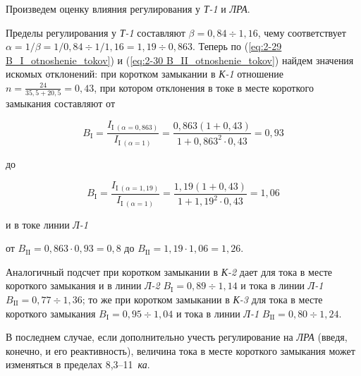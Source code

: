 \begin{small}
	Произведем оценку влияния регулирования у \textit{Т-1} и \textit{ЛРА}.
	
	Пределы регулирования у \textit{Т-1} составляют $ \beta = 0,84 \div 1,16 $, чему соответствует $ \alpha = 1/\beta = 1/0,84 \div 1/1,16 = 1,19 \div 0,863 $. Теперь по (\ref{eq:2-29 B_I_otnoshenie_tokov}) и (\ref{eq:2-30 B_II_otnoshenie_tokov}) найдем значения искомых отклонений: при коротком замыкании в \textit{К-1} отношение $ n = \frac{24}{35,5 + 20,5} = 0,43 $, при котором отклонения в токе в месте короткого замыкания составляют от
	
	\begin{equation*}
		B_{\text{I}} = \frac{I_{\text{I}~(\alpha=0,863)}}{I_{\text{I}~(\alpha=1)}} = \frac{0,863 (1+0,43)}{1 + 0,863^2 \cdot 0,43} = 0,93
	\end{equation*}
	
	до
	
	\begin{equation*}
		B_\text{I} = \frac{I_{\text{I}~(\alpha=1,19)}}{I_{\text{I}~(\alpha=1)}} = \frac{1,19 (1+0,43)}{1 + 1,19^2 \cdot 0,43} = 1,06
	\end{equation*}
	
	и в токе линии \textit{Л-1}
	
	от $ B_{\text{II}} = 0,863 \cdot 0,93 = 0,8 $ до $ B_{\text{II}} = 1,19 \cdot 1,06 = 1,26 $.
	
	Аналогичный подсчет при коротком замыкании в \textit{К-2} дает для тока в месте короткого замыкания и в линии \textit{Л-2} $ B_{\text{I}} = 0,89 \div 1,14 $ и тока в линии \textit{Л-1} $ B_{\text{II}} = 0,77 \div 1,36 $; то же при коротком замыкании в \textit{К-3} для тока в месте короткого замыкания $ B_{\text{I}} = 0,95 \div 1,04 $ и тока в линии \textit{Л-1} $ B_{\text{II}} = 0,80 \div 1,24 $.
	
	В последнем случае, если дополнительно учесть регулирование на \textit{ЛРА} (введя, конечно, и его реактивность), величина тока в месте короткого замыкания может изменяться в пределах  8,3--11~\textit{ка}.
	
	
	
	
	
	
	
	
\end{small}







































